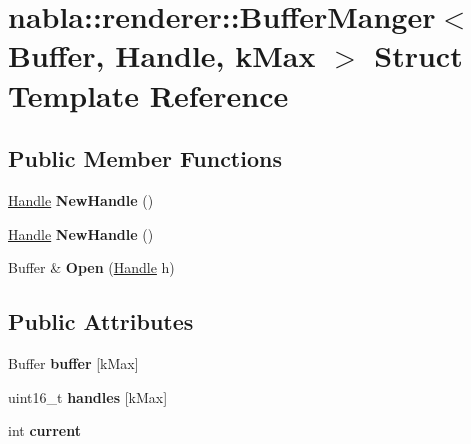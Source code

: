 \hypertarget{structnabla_1_1renderer_1_1_buffer_manger}{}\section{nabla\+::renderer\+::Buffer\+Manger$<$ Buffer, Handle, k\+Max $>$ Struct Template Reference}
\label{structnabla_1_1renderer_1_1_buffer_manger}
\subsection*{Public Member Functions}
\begin{DoxyCompactItemize}
\item 
\mbox{\label{structnabla_1_1renderer_1_1_buffer_manger_a47bebbcecb606ecf671b406efb9f6492}} 
\mbox{\hyperlink{classnabla_1_1renderer_1_1_handle}{Handle}} {\bfseries New\+Handle} ()
\item 
\mbox{\label{structnabla_1_1renderer_1_1_buffer_manger_a47bebbcecb606ecf671b406efb9f6492}} 
\mbox{\hyperlink{classnabla_1_1renderer_1_1_handle}{Handle}} {\bfseries New\+Handle} ()
\item 
\mbox{\label{structnabla_1_1renderer_1_1_buffer_manger_ad97217fefce0b07c83e5410f4fca3dbf}} 
Buffer \& {\bfseries Open} (\mbox{\hyperlink{classnabla_1_1renderer_1_1_handle}{Handle}} h)
\end{DoxyCompactItemize}
\subsection*{Public Attributes}
\begin{DoxyCompactItemize}
\item 
\mbox{\label{structnabla_1_1renderer_1_1_buffer_manger_af150af5fb0c6266ab28a1bbe12f46930}} 
Buffer {\bfseries buffer} \mbox{[}k\+Max\mbox{]}
\item 
\mbox{\label{structnabla_1_1renderer_1_1_buffer_manger_ac2e3b18dc987172008549530fb57103b}} 
uint16\+\_\+t {\bfseries handles} \mbox{[}k\+Max\mbox{]}
\item 
\mbox{\label{structnabla_1_1renderer_1_1_buffer_manger_a97aed9c860bd5e5e415d215505c5d593}} 
int {\bfseries current}
\end{DoxyCompactItemize}


